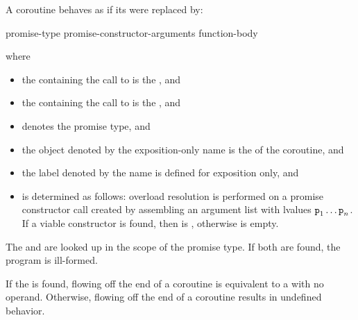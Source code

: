 \pnum
A coroutine behaves as if its  were replaced by:
\begin{ncsimplebnf}
\terminal{\{}\br
\bnfindent promise-type  promise-constructor-arguments \terminal{;}\br
\bnfindent {}  \terminal{;}\br
\bnfindent {}\br
\bnfindent\bnfindent function-body\br
\bnfindent {}\br
\bnfindent\bnfindent {} \terminal{;}\br
\bnfindent \terminal{\}}\br
{} \terminal{:}\br
\bnfindent {}  \terminal{;}\br
\terminal{\}}
\end{ncsimplebnf}
where
\begin{itemize}
\item
the  containing
the call to 
is the , and
\item
the  containing
the call to 
is the , and
\item
{} denotes the promise type, and
\item
the object denoted by the exposition-only name 
is the  of the coroutine, and
\item
the label denoted by the name 
is defined for exposition only, and
\item
{} is determined as follows:
overload resolution is performed on a promise constructor call created by
assembling an argument list with lvalues $\texttt{p}_1 \dotsc \texttt{p}_n$. If a viable
constructor is found, then
 is
, otherwise
 is empty.
\end{itemize}

\pnum
The  
and  are looked up in the scope of the promise type.
If both are found, the program is ill-formed.
\begin{note}
If the   is found, flowing off
the end of a coroutine is equivalent to a  with no operand.
Otherwise, flowing off the end of a coroutine
results in undefined behavior.
\end{note}

